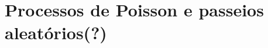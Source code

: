 \documentclass[../Notas.tex]{subfiles}
\begin{document}
\section{Processos de Poisson e passeios aleatórios(?)}
\end{document}
